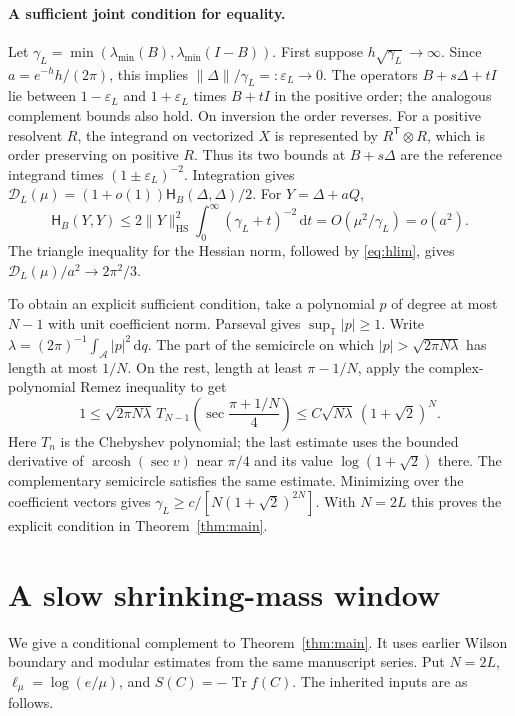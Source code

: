 \documentclass[11pt,letterpaper]{article}
\newcommand{\Tr}{\operatorname{Tr}}
\newcommand{\HS}{\mathrm{HS}}
\newcommand{\cD}{\mathcal D}
\newcommand{\cH}{\mathsf H}
\newcommand{\dd}{\,\mathrm d}
\newcommand{\lmu}{\ell_\mu}
\newcommand{\arc}{\mathcal A}
\begin{document}
\paragraph{A sufficient joint condition for equality.}
Let \(\gamma_L=\min(\lambda_{\min}(B),\lambda_{\min}(I-B))\). First suppose \(h\sqrt{\gamma_L}\to\infty\). Since \(a=e^{-h}h/(2\pi)\), this implies \(\|\Delta\|/\gamma_L=:\varepsilon_L\to0\). The operators \(B+s\Delta+tI\) lie between \(1-\varepsilon_L\) and \(1+\varepsilon_L\) times \(B+tI\) in the positive order; the analogous complement bounds also hold. On inversion the order reverses. For a positive resolvent \(R\), the integrand on vectorized \(X\) is represented by \(R^{\mathsf T}\otimes R\), which is order preserving on positive \(R\). Thus its two bounds at \(B+s\Delta\) are the reference integrand times \((1\pm\varepsilon_L)^{-2}\). Integration gives \(\cD_L(\mu)=(1+o(1))\cH_B(\Delta,\Delta)/2\). For \(Y=\Delta+aQ\),
\[
 \cH_B(Y,Y)\le 2\|Y\|_{\HS}^2\int_0^\infty(\gamma_L+t)^{-2}\dd t
   = O(\mu^2/\gamma_L)=o(a^2).
\]
The triangle inequality for the Hessian norm, followed by \eqref{eq:hlim}, gives \(\cD_L(\mu)/a^2\to 2\pi^2/3\).

To obtain an explicit sufficient condition, take a polynomial \(p\) of degree at most \(N-1\) with unit coefficient norm. Parseval gives \(\sup_{\mathbb T}|p|\ge1\). Write \(\lambda=(2\pi)^{-1}\int_\arc |p|^2\dd q\). The part of the semicircle on which \(|p|>\sqrt{2\pi N\lambda}\) has length at most \(1/N\). On the rest, length at least \(\pi-1/N\), apply the complex-polynomial Remez inequality \cite[Theorem 1.2]{ty} to get
\[
 1\le\sqrt{2\pi N\lambda}\,
 T_{N-1}\!\left(\sec\frac{\pi+1/N}{4}\right)
 \le C\sqrt{N\lambda}\,(1+\sqrt2)^N .
\]
Here \(T_n\) is the Chebyshev polynomial; the last estimate uses the bounded derivative of \(\operatorname{arcosh}(\sec v)\) near \(\pi/4\) and its value \(\log(1+\sqrt2)\) there. The complementary semicircle satisfies the same estimate. Minimizing over the coefficient vectors gives \(\gamma_L\ge c/[N(1+\sqrt2)^{2N}]\). With \(N=2L\) this proves the explicit condition in Theorem~\ref{thm:main}.

\section{A slow shrinking-mass window}\label{sec:slow}
We give a conditional complement to Theorem~\ref{thm:main}. It uses earlier Wilson boundary and modular estimates from the same manuscript series. Put \(N=2L\), \(\lmu=\log(e/\mu)\), and \(S(C)=-\Tr f(C)\). The inherited inputs are as follows.
\end{document}
